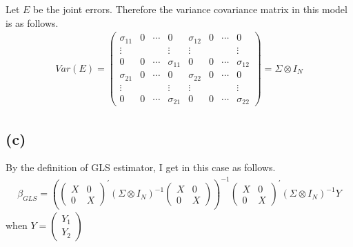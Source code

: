 \documentclass{article}
\begin{document}
 Let $E$ be the joint errors. Therefore the variance covariance matrix in this model is as follows.
\begin{align*}
	Var\left(E \right) = \begin{pmatrix}\sigma_{11}& 0& \cdots& 0&\sigma_{12}&0 &\cdots & 0\\
	\vdots&&&\vdots&\vdots&&&\vdots\\
	0&0&\cdots&\sigma_{11}&0&0&\cdots&\sigma_{12}\\
	\sigma_{21}& 0& \cdots& 0&\sigma_{22}&0 &\cdots & 0\\
	\vdots&&&\vdots&\vdots&&&\vdots\\
	0&0&\cdots&\sigma_{21}&0&0&\cdots&\sigma_{22}
	\end{pmatrix}
	=\Sigma \otimes I_N
\end{align*}

\subsection{(c)}
By the definition of GLS estimator, I get in this case as follows.
\begin{align*}
	\beta_{GLS} = \left(\left(\begin{array}{cc} X & 0 \\ 0 & X \end{array}\right)^{'} \left(\Sigma \otimes I_N \right)^{-1} \left(\begin{array}{cc} X & 0 \\ 0 & X \end{array}\right)\right)^{-1} \left(\begin{array}{cc} X & 0 \\ 0 & X \end{array}\right)^{'} \left(\Sigma \otimes I_N \right)^{-1} Y
\end{align*}
when $Y = \left(\begin{array}{cc} Y_1\\Y_2 \end{array}\right)$
\end{document}
